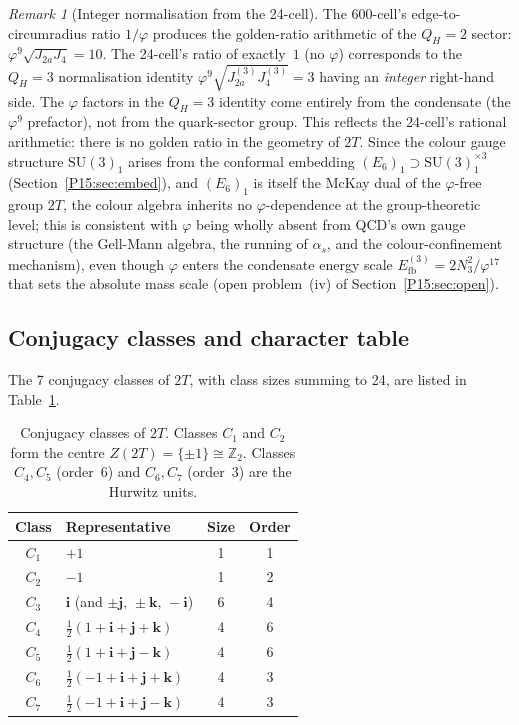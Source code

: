 \documentclass[11pt,a4paper]{article}
\theoremstyle{definition}\newtheorem{definition}[theorem]{Definition}
\theoremstyle{remark}
\newtheorem{remark}[theorem]{Remark}
\newcommand{\vp}{\varphi}
\newcommand{\Ja}{J_{2a}}
\newcommand{\SU}{\mathrm{SU}}
\newcommand{\Efb}{E_{\mathrm{fb}}}
\newcommand{\twoT}{2T}
\newcommand{\QH}{Q_H}
\begin{document}
\begin{remark}[Integer normalisation from the 24-cell]
\label{P15:rem:integer_norm_24cell}
The 600-cell's edge-to-circumradius ratio $1/\vp$ produces the
golden-ratio arithmetic of the $\QH=2$ sector: $\vp^9\sqrt{\Ja J_4}=10$.
The 24-cell's ratio of exactly~$1$ (no $\vp$) corresponds to the
$\QH=3$ normalisation identity $\vp^9\sqrt{\Ja^{(3)}J_4^{(3)}}=3$
having an \emph{integer} right-hand side.
The $\vp$ factors in the $\QH=3$ identity come entirely from the
condensate (the $\vp^9$ prefactor), not from the quark-sector group.
This reflects the 24-cell's rational arithmetic: there is no
golden ratio in the geometry of $\twoT$.
Since the colour gauge structure $\SU(3)_1$ arises from the conformal
embedding $(E_6)_1\supset\SU(3)_1^{\times3}$ (Section~\ref{P15:sec:embed}),
and $(E_6)_1$ is itself the McKay dual of the $\vp$-free group $\twoT$,
the colour algebra inherits no $\vp$-dependence at the group-theoretic
level; this is consistent with $\vp$ being wholly absent from QCD's
own gauge structure (the Gell-Mann algebra, the running of $\alpha_s$,
and the colour-confinement mechanism), even though $\vp$ enters the
condensate energy scale $\Efb^{(3)}=2N_3^2/\vp^{17}$ that sets the
absolute mass scale (open problem~(iv) of Section~\ref{P15:sec:open}).
\end{remark}

\subsection{Conjugacy classes and character table}

The 7 conjugacy classes of $\twoT$, with class sizes summing to 24,
are listed in Table~\ref{P15:tab:2T_classes}.

\begin{table}[h!]
\centering
\renewcommand{\arraystretch}{1.25}
\begin{tabular}{clcc}
\toprule
Class & Representative & Size & Order \\
\midrule
$C_1$ & $+1$ & 1 & 1 \\
$C_2$ & $-1$ & 1 & 2 \\
$C_3$ & $\mathbf{i}$ (and $\pm\mathbf{j},\,\pm\mathbf{k},\,-\mathbf{i}$) & 6 & 4 \\
$C_4$ & $\tfrac12(1+\mathbf{i}+\mathbf{j}+\mathbf{k})$ & 4 & 6 \\
$C_5$ & $\tfrac12(1+\mathbf{i}+\mathbf{j}-\mathbf{k})$ & 4 & 6 \\
$C_6$ & $\tfrac12(-1+\mathbf{i}+\mathbf{j}+\mathbf{k})$ & 4 & 3 \\
$C_7$ & $\tfrac12(-1+\mathbf{i}+\mathbf{j}-\mathbf{k})$ & 4 & 3 \\
\bottomrule
\end{tabular}
\caption{Conjugacy classes of $\twoT$.
Classes $C_1$ and $C_2$ form the centre $Z(\twoT)=\{\pm1\}\cong\mathbb{Z}_2$.
Classes $C_4,C_5$ (order~6) and $C_6,C_7$ (order~3) are the Hurwitz units.}
\label{P15:tab:2T_classes}
\end{table}
\end{document}
